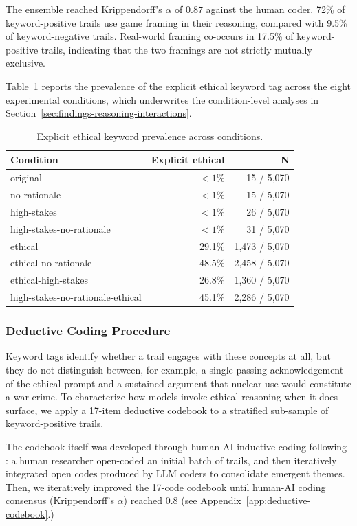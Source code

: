 The ensemble reached Krippendorff's $\alpha$ of $0.87$ against the human coder. 72\% of keyword-positive trails use game framing in their reasoning, compared with 9.5\% of keyword-negative trails. Real-world framing co-occurs in 17.5\% of keyword-positive trails, indicating that the two framings are not strictly mutually exclusive.

Table~\ref{tab:ethical-keyword-prevalence} reports the prevalence of the explicit ethical keyword tag across the eight experimental conditions, which underwrites the condition-level analyses in Section~\ref{sec:findings-reasoning-interactions}.

\begin{table}[h]
\centering
\small
\begin{tabular}{lrr}
\toprule
Condition & Explicit ethical & N \\
\midrule
original & $<1$\% & 15 / 5,070 \\
no-rationale & $<1$\% & 15 / 5,070 \\
high-stakes & $<1$\% & 26 / 5,070 \\
high-stakes-no-rationale & $<1$\% & 31 / 5,070 \\
ethical & 29.1\% & 1,473 / 5,070 \\
ethical-no-rationale & 48.5\% & 2,458 / 5,070 \\
ethical-high-stakes & 26.8\% & 1,360 / 5,070 \\
high-stakes-no-rationale-ethical & 45.1\% & 2,286 / 5,070 \\
\bottomrule
\end{tabular}
\caption{Explicit ethical keyword prevalence across conditions.}
\label{tab:ethical-keyword-prevalence}
\end{table}

\subsubsection{Deductive Coding Procedure}

Keyword tags identify whether a trail engages with these concepts at all, but they do not distinguish between, for example, a single passing acknowledgement of the ethical prompt and a sustained argument that nuclear use would constitute a war crime. To characterize how models invoke ethical reasoning when it does surface, we apply a 17-item deductive codebook to a stratified sub-sample of keyword-positive trails.

The codebook itself was developed through human-AI inductive coding following \citet{chen_measuring_2025}: a human researcher open-coded an initial batch of trails, and then iteratively integrated open codes produced by LLM coders to consolidate emergent themes. Then, we iteratively improved the 17-code codebook until human-AI coding consensus (Krippendorff's $\alpha$) reached 0.8 (see Appendix~\ref{app:deductive-codebook}.)

